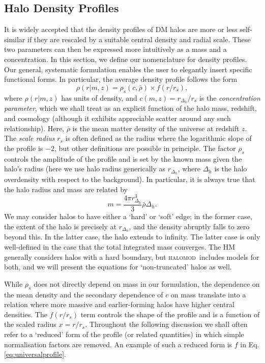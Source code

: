 \documentclass[5p,aas_macros]{elsarticle}
\newcommand{\halomod}{\textsc{halomod}}
\begin{document}
\subsection{Halo Density Profiles}
\label{sec:profilestheory}
It is widely accepted that the density profiles of DM halos are more or less self-similar if they are rescaled by a suitable central density and radial scale. These two parameters can then be expressed more intuitively as a mass and a concentration. In this section, we define our nomenclature for density profiles. Our general, systematic formulation enables the user to elegantly insert specific functional forms. In particular, the average density profile follows the form
\begin{equation}
    \label{eq:universalprofile}
    \rho(r|m,z) = \rho_s(c, \bar{\rho}) \times f(r/r_s),
\end{equation}
where $\rho(r|m,z)$ has units of density, and $c(m,z) = r_{\Delta_h} / r_s$ is the \textit{concentration parameter}, which we shall treat as an explicit function of the halo mass, redshift, and cosmology (although it exhibits appreciable scatter around any such relationship). Here, $\bar{\rho}$ is the mean matter density of the universe at redshift $z$.  The \textit{scale radius} $r_s$ is often defined as the radius where the logarithmic slope of the profile is $-2$, but other definitions are possible in principle. The factor $\rho_s$ controls the amplitude of the profile and is set by the known mass given the halo's radius (here we use halo radius generically as $r_{\Delta_h}$, where $\Delta_h$ is the halo overdensity with respect to the background). In particular, it is always true that the halo radius and mass are related by
\begin{equation}
    \label{eq:mass-radius-halo}
    m = \frac{4\pi r^3_{\Delta_h}}{3} \bar{\rho} \Delta_h.
\end{equation}
We may consider halos to have either a `hard' or `soft' edge; in the former case, the extent of the halo is precisely at $r_{\Delta_h}$, and the density abruptly falls to zero beyond this. In the latter case, the halo extends to infinity. The latter case is only well-defined in the case that the total integrated mass converges. The HM generally considers halos with a hard boundary, but \halomod\ includes models for both, and we will present the equations for `non-truncated' halos as well.

While $\rho_s$ does not directly depend on mass in our formulation, the dependence on the mean density and the secondary dependence of $c$ on mass translate into a relation where more massive and earlier-forming halos have higher central densities. The $f(r/r_s)$ term controls the shape of the profile and is a function of the scaled radius $x=r/r_s$. Throughout the following discussion we shall often refer to a `reduced' form of the profile (or related quantities) in which simple normalisation factors are removed. An example of such a reduced form is $f$ in Eq. \ref{eq:universalprofile}.
\end{document}
